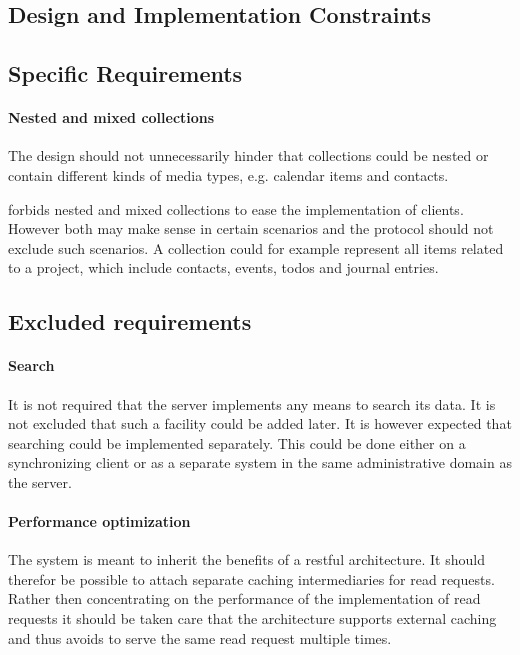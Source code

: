 \documentclass[12pt,a4paper]{scrartcl}		%
\begin{document}
\subsection{Design and Implementation Constraints}

\subsection{Specific Requirements}

\paragraph{Nested and mixed collections}
The design should not unnecessarily hinder that collections could be nested or
contain different kinds of media types, e.g. calendar items and contacts. 

\cite[sec. 5.2]{RFC6352} forbids nested and mixed collections to ease the
implementation of clients. However both may make sense in certain scenarios and
the protocol should not exclude such scenarios. A collection could for example
represent all items related to a project, which include contacts, events, todos
and journal entries.

\subsection{Excluded requirements}
\label{sec:excluded-requirements}
\paragraph{Search}
It is not required that the server implements any means to search its data. It
is not excluded that such a facility could be added later. It is however
expected that searching could be implemented separately. This could be done
either on a synchronizing client or as a separate system in the same
administrative domain as the server.

\paragraph{Performance optimization}
The system is meant to inherit the benefits of a restful architecture. It should
therefor be possible to attach separate caching intermediaries for read
requests. Rather then concentrating on the performance of the implementation of
read requests it should be taken care that the architecture supports external
caching and thus avoids to serve the same read request multiple times.
\end{document}
